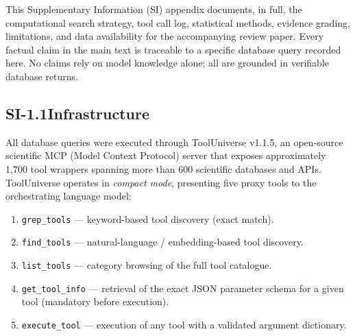 


\sloppy  %

\bigskip

This Supplementary Information (SI) appendix documents, in full, the
computational search strategy, tool call log, statistical methods, evidence
grading, limitations, and data availability for the accompanying review
paper.  Every factual claim in the main text is traceable to a specific
database query recorded here.  No claims rely on model knowledge alone;
all are grounded in verifiable database returns.


\subsection*{SI-1.1\quad Infrastructure}

All database queries were executed through ToolUniverse v1.1.5, an open-source
scientific MCP (Model Context Protocol) server that exposes approximately
1,700 tool wrappers spanning more than 600 scientific databases and APIs.
ToolUniverse operates in \emph{compact mode}, presenting five proxy tools to
the orchestrating language model:

\begin{enumerate}[nosep]
  \item \texttt{grep\_tools} — keyword-based tool discovery (exact match).
  \item \texttt{find\_tools} — natural-language / embedding-based tool
        discovery.
  \item \texttt{list\_tools} — category browsing of the full tool catalogue.
  \item \texttt{get\_tool\_info} — retrieval of the exact JSON parameter
        schema for a given tool (mandatory before execution).
  \item \texttt{execute\_tool} — execution of any tool with a validated
        argument dictionary.
\end{enumerate}

